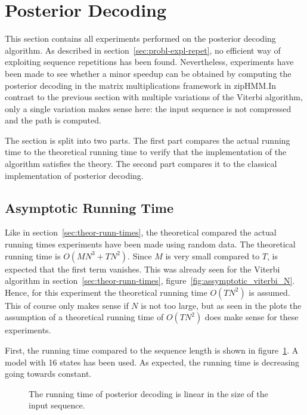 \section{Posterior Decoding}

This section contains all experiments performed on the posterior decoding
algorithm. As described in section~\ref{sec:probl-expl-repet}, no efficient way
of exploiting sequence repetitions has been found. Nevertheless, experiments
have been made to see whether a minor speedup can be obtained by computing the
posterior decoding in the matrix multiplications framework in zipHMM.\@ In
contrast to the previous section with multiple variations of the Viterbi
algorithm, only a single variation makes sense here: the input sequence is not
compressed and the path is computed.

The section is split into two parts. The first part compares the actual
running time to the theoretical running time to verify that the implementation
of the algorithm satisfies the theory. The second part compares it to the
classical implementation of posterior decoding.

\subsection{Asymptotic Running Time}
\label{sec:asympt-runn-time}

Like in section~\ref{sec:theor-runn-times}, the theoretical compared the actual
running times experiments have been made using random data. The theoretical
running time is $O(M N^3 + TN^2)$. Since $M$ is very small compared to $T$, is
expected that the first term vanishes. This was already seen for the Viterbi
algorithm in section~\ref{sec:theor-runn-times},
figure~\ref{fig:assymptotic_viterbi_N}. Hence, for this experiment the
theoretical running time $O(TN^2)$ is assumed. This of course only makes sense
if $N$ is not too large, but as seen in the plots the assumption of a
theoretical running time of $O(TN^2)$ does make sense for these experiments.

First, the running time compared to the sequence length is shown in
figure~\ref{fig:posterior_T}. A model with 16 states has been used. As expected,
the running time is decreasing going towards constant.

\begin{figure}
  \centering
  
  \caption{The running time of posterior decoding is linear in the size of the
    input sequence.}
  \label{fig:posterior_T}
\end{figure}

